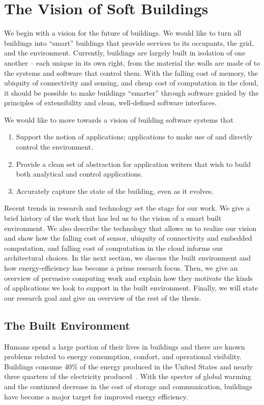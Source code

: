 \chapter{The Vision of Soft Buildings}

We begin with a vision for the future of buildings.  We would like to turn all buildings into ``smart''
buildings that provide services to its occupants, the grid, and the environment.  Currently, buildings
are largely built in isolation of one another -- each unique in its own right, from the material the walls
are made of to the systems and software that control them.  With the falling cost of memory, the ubiquity of
connectivity and sensing, and cheap cost of computation in the cloud, it should be possible to make buildings ``smarter''
through software guided by the principles of extensibility and clean, well-defined software interfaces.

We would like to move towards a vision of building software systems that

\begin{enumerate}
\item Support the notion of applications; applications to make use of and directly control the environment.
\item Provide a clean set of abstraction for application writers that wish to build both analytical and control
applications.
\item Accurately capture the state of the building, even as it evolves.
\end{enumerate}


Recent trends in research and technology set the stage for our work.  We give a brief history of the work that has 
led us to the vision of a smart built environment.  We also describe the technology that
allows us to realize our vision and show how the falling cost of sensor, ubiquity of connectivity and embedded computation,
and falling cost of computation in the cloud informs our architectural choices.
In the next section, 
we discuss the built environment and how energy-efficiency has become a prime research focus.
Then, we give an overview of pervasive computing work and explain how they motivate the kinds of applications we look 
to support in the built environment.  Finally, we will state our research goal and give an overview of the rest
of the thesis.




\section{The Built Environment}
Humans spend a large portion of their lives in buildings and
there are known problems related to energy consumption, comfort, and operational visibility.  
Buildings consume 40\% of the energy produced in the United States and nearly three quarters of 
the electricity produced~\cite{epabuildings}.  With the specter of global warming and the continued decrease in the cost of storage and 
communication, buildings have become a major target for improved energy efficiency.

